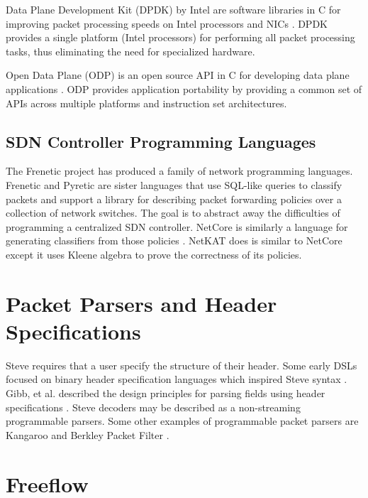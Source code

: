 Data Plane Development Kit (DPDK) by Intel are software libraries in C for improving packet processing speeds on Intel processors and NICs \cite{dpdk_webpage}. DPDK provides a single platform (Intel processors) for performing all packet processing tasks, thus eliminating the need for specialized hardware.

Open Data Plane (ODP) is an open source API in C for developing data plane applications \cite{odp_webpage}. ODP provides application portability by providing a common set of APIs across multiple platforms and instruction set architectures.

\subsection{SDN Controller Programming Languages} \label{rel:frenetic}

The Frenetic project has produced a family of network programming
languages. Frenetic \cite{foster2011frenetic, foster2013frenetic} and Pyretic \cite{modularpyretic} are sister languages
that use SQL-like queries to classify packets and support a library for describing
packet forwarding policies over a collection of network switches. The goal is to
abstract away the difficulties of programming a centralized SDN controller.
NetCore is similarly a language for
generating classifiers from those policies \cite{monsanto2012netcore}. 
NetKAT does is similar to NetCore except it uses Kleene algebra \cite{kozen2014netkat, anderson2014netkat} to prove the correctness of its policies.

\section{Packet Parsers and Header Specifications}

Steve requires that a user specify the structure of their header.
Some early DSLs focused on binary header specification languages which inspired Steve syntax \cite{binpac, packet_types, datascript}.
Gibb, et al. described the design principles for parsing fields using header specifications
\cite{parser2013gibb}. Steve decoders may be described as a non-streaming programmable parsers. 
Some other examples of programmable packet parsers are Kangaroo \cite{kangaroo} and Berkley Packet Filter \cite{bpf1993mccanne}.

\section{Freeflow}
\label{rel:freeflow}

